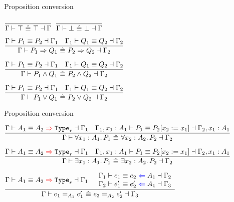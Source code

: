 \begin{frame}{Proposition conversion}

\begin{center}
  $\infrule{}{\checkpropconvwhnf{\Gamma}{\True}{\True}{\Gamma}}$ \quad
  $\infrule{}{\checkpropconvwhnf{\Gamma}{\False}{\False}{\Gamma}}$

  \vspace{2em}

  $\infrule{\checkpropconv{\Gamma}{P_1}{P_2}{\Gamma_1} \quad \checkpropconv{\Gamma_1}{Q_1}{Q_2}{\Gamma_2}}{\checkpropconvwhnf{\Gamma}{\Impl{P_1}{Q_1}}{\Impl{P_2}{Q_2}}{\Gamma_2}}$

  \vspace{2em}

  $\infrule{\checkpropconv{\Gamma}{P_1}{P_2}{\Gamma_1} \quad \checkpropconv{\Gamma_1}{Q_1}{Q_2}{\Gamma_2}}{\checkpropconvwhnf{\Gamma}{\And{P_1}{Q_1}}{\And{P_2}{Q_2}}{\Gamma_2}}$

  \vspace{2em}

  $\infrule{\checkpropconv{\Gamma}{P_1}{P_2}{\Gamma_1} \quad \checkpropconv{\Gamma_1}{Q_1}{Q_2}{\Gamma_2}}{\checkpropconvwhnf{\Gamma}{\Or{P_1}{Q_1}}{\Or{P_2}{Q_2}}{\Gamma_2}}$
\end{center}

\end{frame}

\begin{frame}{Proposition conversion}

\begin{center}
  $\infrule{\infertypeconv{\Gamma}{A_1}{A_2}[r]{\Gamma_1} \quad \checkpropconv{\extend{\Gamma_1}{x_1}{A_1}}{P_1}{\subst{P_2}{x_2}{x_1}}{\extend{\Gamma_2}{x_1}{A_1}}}{\checkpropconvwhnf{\Gamma}{\All{x_1}[A_1]{P_1}}{\All{x_2}[A_2]{P_2}}{\Gamma_2}}$

  \vspace{2em}

  $\infrule{\infertypeconv{\Gamma}{A_1}{A_2}[r]{\Gamma_1} \quad \checkpropconv{\extend{\Gamma_1}{x_1}{A_1}}{P_1}{\subst{P_2}{x_2}{x_1}}{\extend{\Gamma_2}{x_1}{A_1}}}{\checkpropconvwhnf{\Gamma}{\Ex{x_1}[A_1]{P_1}}{\Ex{x_2}[A_2]{P_2}}{\Gamma_2}}$

  \vspace{2em}

  $\infrule{\infertypeconv{\Gamma}{A_1}{A_2}[r]{\Gamma_1} \quad \begin{array}{l} \checktermconv{\Gamma_1}{e_1}{e_2}{A_1}{\Gamma_2} \\ \checktermconv{\Gamma_2}{e_1'}{e_2'}{A_1}{\Gamma_3} \end{array}}{\checkpropconvwhnf{\Gamma}{\Eq[A_1]{e_1}{e_1'}}{\Eq[A_2]{e_2}{e_2'}}{\Gamma_3}}$
\end{center}

\end{frame}

